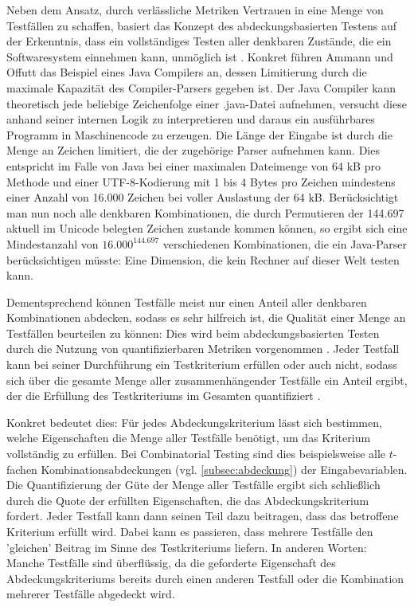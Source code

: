 Neben dem Ansatz, durch verlässliche Metriken Vertrauen in eine Menge von Testfällen zu schaffen, basiert das Konzept des abdeckungsbasierten Testens auf der Erkenntnis, dass ein vollständiges Testen aller denkbaren Zustände, die ein Softwaresystem einnehmen kann, unmöglich ist \cite[S. 16 f.]{ammann2008introduction}. Konkret führen Ammann und Offutt \cite[S. 16]{ammann2008introduction} das Beispiel eines Java Compilers an, dessen Limitierung durch die maximale Kapazität des Compiler-Parsers gegeben ist. Der Java Compiler kann theoretisch jede beliebige Zeichenfolge einer .java-Datei aufnehmen, versucht diese anhand seiner internen Logik zu interpretieren und daraus ein ausführbares Programm in Maschinencode zu erzeugen. Die Länge der Eingabe ist durch die Menge an Zeichen limitiert, die der zugehörige Parser aufnehmen kann. Dies entspricht im Falle von Java bei einer maximalen Dateimenge von 64 kB pro Methode \cite{deva_2021} und einer UTF-8-Kodierung mit 1 bis 4 Bytes pro Zeichen mindestens einer Anzahl von 16.000 Zeichen bei voller Auslastung der 64 kB. Berücksichtigt man nun noch alle denkbaren Kombinationen, die durch Permutieren der 144.697 aktuell im Unicode belegten Zeichen \cite{unicode} zustande kommen können, so ergibt sich eine Mindestanzahl von $16.000^{144.697}$ verschiedenen Kombinationen, die ein Java-Parser berücksichtigen müsste: Eine Dimension, die kein Rechner auf dieser Welt testen kann.

Dementsprechend können Testfälle meist nur einen Anteil aller denkbaren Kombinationen abdecken, sodass es sehr hilfreich ist, die Qualität einer Menge an Testfällen beurteilen zu können: Dies wird beim abdeckungsbasierten Testen durch die Nutzung von quantifizierbaren Metriken vorgenommen \cite[S. 17]{ammann2008introduction}. Jeder Testfall kann bei seiner Durchführung ein Testkriterium erfüllen oder auch nicht, sodass sich über die gesamte Menge aller zusammenhängender Testfälle ein Anteil ergibt, der die Erfüllung des Testkriteriums im Gesamten quantifiziert \cite[S. 17]{ammann2008introduction}. 

Konkret bedeutet dies: Für jedes Abdeckungskriterium lässt sich bestimmen, welche Eigenschaften die Menge aller Testfälle benötigt, um das Kriterium vollständig zu erfüllen. Bei Combinatorial Testing sind dies beispielsweise alle $t$-fachen Kombinationsabdeckungen (vgl. \autoref{subsec:abdeckung}) der Eingabevariablen. Die Quantifizierung der Güte der Menge aller Testfälle ergibt sich schließlich durch die Quote der erfüllten Eigenschaften, die das Abdeckungskriterium fordert. Jeder Testfall kann dann seinen Teil dazu beitragen, dass das betroffene Kriterium erfüllt wird. Dabei kann es passieren, dass mehrere Testfälle den 'gleichen' Beitrag im Sinne des Testkriteriums liefern. In anderen Worten: Manche Testfälle sind überflüssig, da die geforderte Eigenschaft des Abdeckungskriteriums bereits durch einen anderen Testfall oder die Kombination mehrerer Testfälle abgedeckt wird. 

